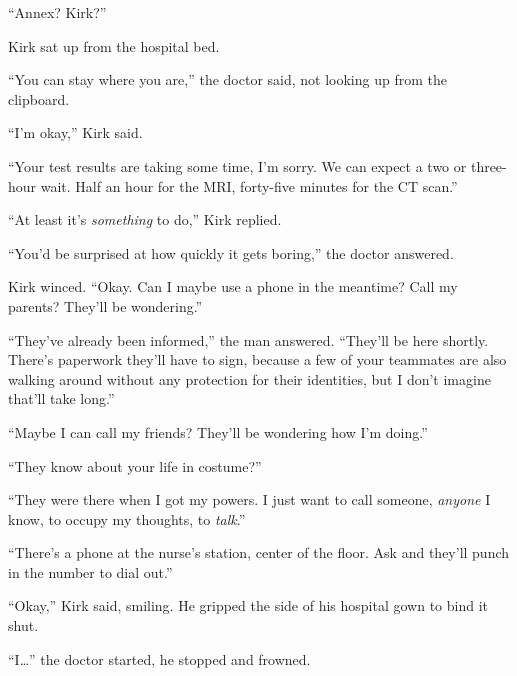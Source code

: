 \sectionbreak



``Annex?  Kirk?''



Kirk sat up from the hospital bed.



``You can stay where you are,'' the doctor said, not looking up from the clipboard.



``I'm okay,'' Kirk said.



``Your test results are taking some time, I'm sorry.  We can expect a two or three-hour wait.  Half an hour for the MRI, forty-five minutes for the CT scan.''



``At least it's \emph{something} to do,'' Kirk replied.



``You'd be surprised at how quickly it gets boring,'' the doctor answered.



Kirk winced.  ``Okay.  Can I maybe use a phone in the meantime?  Call my parents?  They'll be wondering.''



``They've already been informed,'' the man answered.  ``They'll be here shortly.  There's paperwork they'll have to sign, because a few of your teammates are also walking around without any protection for their identities, but I don't imagine that'll take long.''



``Maybe I can call my friends?  They'll be wondering how I'm doing.''



``They know about your life in costume?''



``They were there when I got my powers.  I just want to call someone, \emph{anyone} I know, to occupy my thoughts, to \emph{talk}.''



``There's a phone at the nurse's station, center of the floor.  Ask and they'll punch in the number to dial out.''



``Okay,'' Kirk said, smiling.  He gripped the side of his hospital gown to bind it shut.



``I\ldots'' the doctor started, he stopped and frowned.




